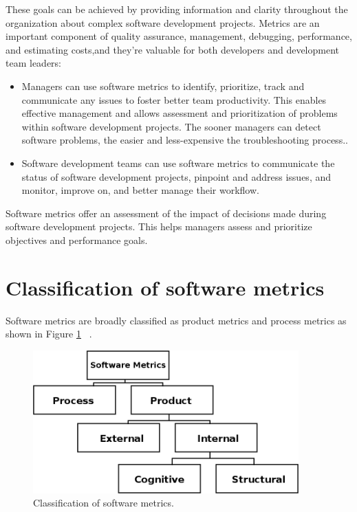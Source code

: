 These goals can be achieved by providing information and clarity throughout the organization about complex software development projects. Metrics are an important component of quality assurance, management, debugging, performance, and estimating costs,and they’re valuable for both developers and development team leaders:

\begin{itemize}
	\item Managers can use software metrics to identify, prioritize, track and communicate any
	issues to foster better team productivity. This enables effective management and allows
	assessment and prioritization of problems within software development projects. The
	sooner managers can detect software problems, the easier and less-expensive the
	troubleshooting process..
	\item Software development teams can use software metrics to communicate the status of
	software development projects, pinpoint and address issues, and monitor, improve on,
	and better manage their workflow.
\end{itemize}

Software metrics offer an assessment of the impact of decisions made during software development projects. This helps managers assess and prioritize objectives and performance goals.

\section{Classification of software metrics}

Software metrics are broadly classified as product metrics and process metrics as shown in Figure \ref{fig:classification} ~\cite{metrics2}.
\begin{figure}[h]
	\centering
	\includegraphics[height=55mm]{figures/classification.png}
	\caption{Classification of software metrics.}
	\label{fig:classification}
\end{figure}


